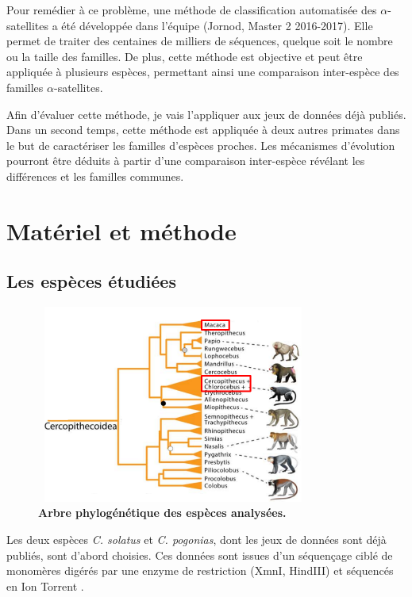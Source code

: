 \documentclass[12pt,a4paper]{article}
\begin{document}
Pour remédier à ce problème, une méthode de classification automatisée des $\alpha$-satellites a été développée dans l'équipe (Jornod, Master 2 2016-2017). Elle permet de traiter des centaines de milliers de séquences, quelque soit le nombre ou la taille des familles. De plus, cette méthode est objective et peut être appliquée à plusieurs espèces, permettant ainsi une comparaison inter-espèce des familles $\alpha$-satellites. 

Afin d'évaluer cette méthode, je  vais l'appliquer aux jeux de données déjà publiés. Dans un second temps, cette méthode est appliquée à deux autres primates dans le but de  caractériser les familles d'espèces proches. Les mécanismes d'évolution pourront être déduits à partir d'une comparaison inter-espèce révélant les différences et les familles communes.

\section{Matériel et méthode}
\subsection{Les espèces étudiées}

	\begin{figure}
		\center
		\includegraphics[height=6.5cm, width=9cm]{img/arbre_presentation.png}
		\caption{\textbf{Arbre phylogénétique des espèces analysées.}\cite{Springer2012}
		\label{fig:arbre_presentation}}
	\end{figure}

Les deux espèces \textit{C. solatus} et \textit{C. pogonias}, dont les jeux de données sont déjà publiés, sont d'abord choisies. Ces données sont issues d'un séquençage ciblé de monomères digérés par une enzyme de restriction (XmnI, HindIII) et séquencés en Ion Torrent \cite{Benjak2015}. 
\end{document}
